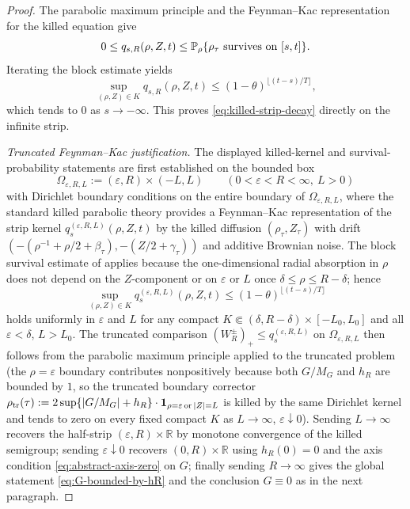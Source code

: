 \documentclass[11pt]{amsart}
\numberwithin{equation}{section}
\theoremstyle{plain}
\theoremstyle{definition}
\theoremstyle{remark}
\begin{document}
\begin{proof}
The parabolic maximum principle and the Feynman--Kac representation for the
killed equation give
\[
   0\le q_{s,R}(\rho,Z,t)
   \le
   \mathbb P_{\rho}\{\rho_\tau\hbox{ survives on }[s,t]\}.
\]
Iterating the block estimate yields
\[
   \sup_{(\rho,Z)\in K}q_{s,R}(\rho,Z,t)
   \le (1-\theta)^{\lfloor (t-s)/T\rfloor},
\]
which tends to \(0\) as \(s\to-\infty\).  This proves
\eqref{eq:killed-strip-decay} directly on the infinite strip.

\smallskip\noindent\emph{Truncated Feynman--Kac justification.}
The displayed killed-kernel and survival-probability statements are first
established on the bounded box
\[
   \Omega_{\varepsilon,R,L}
   :=(\varepsilon,R)\times(-L,L)
   \qquad (0<\varepsilon<R<\infty,\ L>0)
\]
with Dirichlet boundary conditions on the entire boundary of
\(\Omega_{\varepsilon,R,L}\), where the standard killed parabolic theory
provides a Feynman--Kac representation of the strip kernel
\(q^{(\varepsilon,R,L)}_{s}(\rho,Z,t)\) by the killed diffusion
\((\rho_\tau,Z_\tau)\) with drift
\((-(\rho^{-1}+\rho/2+\beta_\tau),-(Z/2+\gamma_\tau))\) and additive Brownian
noise.  The block survival estimate of
 applies because the
one-dimensional radial absorption in \(\rho\) does not depend on the
\(Z\)-component or on \(\varepsilon\) or \(L\) once
\(\delta\le\rho\le R-\delta\); hence
\[
   \sup_{(\rho,Z)\in K}q^{(\varepsilon,R,L)}_{s}(\rho,Z,t)
   \le (1-\theta)^{\lfloor (t-s)/T\rfloor}
\]
holds uniformly in \(\varepsilon\) and \(L\) for any compact
\(K\Subset (\delta,R-\delta)\times[-L_0,L_0]\) and all
\(\varepsilon<\delta\), \(L>L_0\).  The truncated comparison
\((W_R^\pm)_+\le q^{(\varepsilon,R,L)}_s\) on
\(\Omega_{\varepsilon,R,L}\) then follows from the parabolic maximum
principle applied to the truncated problem (the \(\rho=\varepsilon\)
boundary contributes nonpositively because both \(G/M_G\) and \(h_R\) are
bounded by \(1\), so the truncated boundary corrector
\(\rho_{\rm tr}(\tau):=2\sup\{|G/M_G|+h_R\}\cdot
   \mathbf 1_{\rho=\varepsilon\,\mathrm{or}\,|Z|=L}\)
is killed by the same Dirichlet kernel and tends to zero on every fixed
compact \(K\) as \(L\to\infty\), \(\varepsilon\downarrow0\)).  Sending
\(L\to\infty\) recovers the half-strip
\((\varepsilon,R)\times\mathbb R\) by monotone convergence of the killed
semigroup; sending \(\varepsilon\downarrow0\) recovers
\((0,R)\times\mathbb R\) using \(h_R(0)=0\) and the axis condition
\eqref{eq:abstract-axis-zero} on \(G\); finally sending \(R\to\infty\)
gives the global statement \eqref{eq:G-bounded-by-hR} and the conclusion
\(G\equiv0\) as in the next paragraph.


\end{proof}
\end{document}
